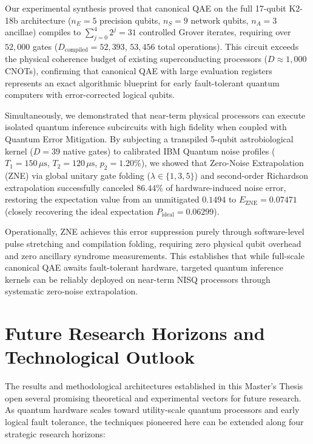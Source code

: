Our experimental synthesis proved that canonical QAE on the full 17-qubit K2-18b architecture ($n_E = 5$ precision qubits, $n_S = 9$ network qubits, $n_A = 3$ ancillae) compiles to $\sum_{j=0}^4 2^j = 31$ controlled Grover iterates, requiring over $52,000$ gates ($D_{\mathrm{compiled}} = 52,393$, $53,456$ total operations). This circuit exceeds the physical coherence budget of existing superconducting processors ($D \approx 1,000$ CNOTs), confirming that canonical QAE with large evaluation registers represents an exact algorithmic blueprint for early fault-tolerant quantum computers with error-corrected logical qubits.

Simultaneously, we demonstrated that near-term physical processors can execute isolated quantum inference subcircuits with high fidelity when coupled with Quantum Error Mitigation. By subjecting a transpiled 5-qubit astrobiological kernel ($D = 39$ native gates) to calibrated IBM Quantum noise profiles ($T_1 = 150\,\mu\mathrm{s}$, $T_2 = 120\,\mu\mathrm{s}$, $p_2 = 1.20\%$), we showed that Zero-Noise Extrapolation (ZNE) via global unitary gate folding ($\lambda \in \{1, 3, 5\}$) and second-order Richardson extrapolation successfully canceled $86.44\%$ of hardware-induced noise error, restoring the expectation value from an unmitigated $0.1494$ to $E_{\mathrm{ZNE}} = 0.07471$ (closely recovering the ideal expectation $P_{\mathrm{ideal}} = 0.06299$).

Operationally, ZNE achieves this error suppression purely through software-level pulse stretching and compilation folding, requiring zero physical qubit overhead and zero ancillary syndrome measurements. This establishes that while full-scale canonical QAE awaits fault-tolerant hardware, targeted quantum inference kernels can be reliably deployed on near-term NISQ processors through systematic zero-noise extrapolation.

\section{Future Research Horizons and Technological Outlook}\label{sec:future_horizons}

The results and methodological architectures established in this Master's Thesis open several promising theoretical and experimental vectors for future research. As quantum hardware scales toward utility-scale quantum processors and early logical fault tolerance, the techniques pioneered here can be extended along four strategic research horizons:

